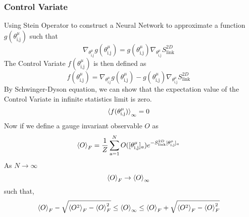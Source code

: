 \subsubsection*{Control Variate}
Using Stein Operator to construct a Neural Network to approximate a function $g(\theta^{\mu}_{\text{i,j}})$ such that
\begin{equation}
    \nabla_{\theta^{\mu}_{\text{i,j}}}g(\theta^{\mu}_{\text{i,j}}) = g(\theta^{\mu}_{\text{i,j}})\nabla_{\theta^{\mu}_{\text{i,j}}}S_{\text{link}}^{2D}
\end{equation}
The Control Variate $f(\theta^{\mu}_{\text{i,j}})$ is then defined as
\begin{equation}
    f(\theta^{\mu}_{\text{i,j}}) =
    \nabla_{\theta^{\mu}_{\text{i,j}}}g(\theta^{\mu}_{\text{i,j}}) - g(\theta^{\mu}_{\text{i,j}})\nabla_{\theta^{\mu}_{\text{i,j}}}S_{\text{link}}^{2D}
    \label{eq:control_variate}
\end{equation}
By Schwinger-Dyson equation, we can show that the expectation value of the Control Variate in infinite statistics limit is zero.
\begin{equation}
    \braket{f(\theta^{\mu}_{\text{i,j}})}_{\infty} = 0
\end{equation}
Now if we define a gauge invariant observable $O$ as
    \begin{equation}
        \braket{O}_F = \frac{1}{Z}\sum_{\text{a}=1}^{N}O([\theta^{\mu}_{\text{i,j}}]_a)e^{-S_{\text{link}}^{2D}[{\theta^{\mu}_{\text{i,j}}}]_a}
    \end{equation}
As $N\rightarrow\infty$ \begin{equation}
    \braket{O}_F \rightarrow \braket{O}_\infty
\end{equation}
such that,
\begin{equation}
    \braket{O}_F-\sqrt{\braket{O^2}_F - \braket{O}_F^2}\leq \braket{O}_\infty \leq \braket{O}_F+\sqrt{\braket{O^2}_F - \braket{O}_F^2} 
\end{equation}
